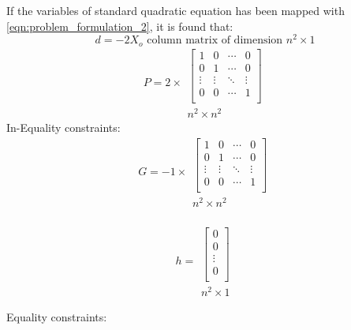 If the variables of standard quadratic equation has been mapped with \ref{eqn:problem_formulation_2}, it is found that:
\begin{equation}
d=-2X_o \textrm{ column matrix of dimension }n^2\times 1
\end{equation}
\[P= 2\times
\begin{array}{c}
    \begin{bmatrix}
        1 & 0 & \cdots & 0\\
        0 & 1 & \cdots & 0\\
        \vdots & \vdots & \ddots & \vdots\\
        0 & 0 & \cdots & 1\\
    \end{bmatrix}\\
    n^2\times n^2
\end{array}
\]
In-Equality constraints:\\
\[G= -1 \times
\begin{array}{c}
    \begin{bmatrix}
        1 & 0 & \cdots & 0\\
        0 & 1 & \cdots & 0\\
        \vdots & \vdots & \ddots & \vdots\\
        0 & 0 & \cdots & 1\\
    \end{bmatrix}\\
    n^2\times n^2
\end{array}
\]
\\
\[h=
\begin{array}{c}
    \begin{bmatrix}
        0 \\
        0 \\
        \vdots\\
        0 \\
    \end{bmatrix}\\
    n^2\times 1
\end{array}
\]

Equality constraints:
































